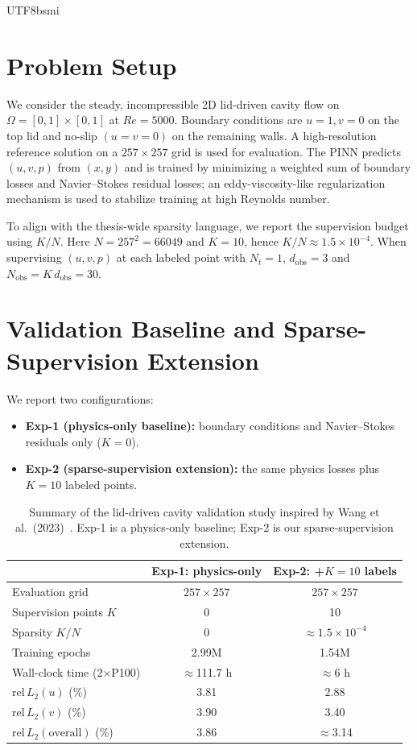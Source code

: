 \documentclass[master]{NTHUthesis}
\begin{document}
\begin{CJK*}{UTF8}{bsmi}
\section{Problem Setup}
We consider the steady, incompressible 2D lid-driven cavity flow on $\Omega=[0,1]\times[0,1]$ at $Re=5000$. Boundary conditions are $u=1, v=0$ on the top lid and no-slip $(u=v=0)$ on the remaining walls. A high-resolution reference solution on a $257\times257$ grid is used for evaluation. The PINN predicts $(u,v,p)$ from $(x,y)$ and is trained by minimizing a weighted sum of boundary losses and Navier--Stokes residual losses; an eddy-viscosity-like regularization mechanism is used to stabilize training at high Reynolds number.

To align with the thesis-wide sparsity language, we report the supervision budget using $K/N$. Here $N=257^2=66049$ and $K=10$, hence $K/N\approx 1.5\times10^{-4}$. When supervising $(u,v,p)$ at each labeled point with $N_t=1$, $d_{\text{obs}}=3$ and $N_{\text{obs}}=K\,d_{\text{obs}}=30$.

\section{Validation Baseline and Sparse-Supervision Extension}
We report two configurations:
\begin{itemize}
    \item \textbf{Exp-1 (physics-only baseline):} boundary conditions and Navier--Stokes residuals only ($K=0$).
    \item \textbf{Exp-2 (sparse-supervision extension):} the same physics losses plus $K=10$ labeled points.
\end{itemize}

\begin{table}[!htbp]
    \centering
    \caption{Summary of the lid-driven cavity validation study inspired by Wang et al.\ (2023)~\cite{wang2023solutionmultiplicityeffectsdata}. Exp-1 is a physics-only baseline; Exp-2 is our sparse-supervision extension.}
    \label{tab:wang2023_repro_summary}
    \footnotesize
    \begin{tabular}{lcc}
        \toprule
        & \textbf{Exp-1: physics-only} & \textbf{Exp-2: +$K{=}10$ labels} \\
        \midrule
        Evaluation grid & $257\times257$ & $257\times257$ \\
        Supervision points $K$ & 0 & 10 \\
        Sparsity $K/N$ & 0 & $\approx 1.5\times10^{-4}$ \\
        Training epochs & 2.99M & 1.54M \\
        Wall-clock time (2$\times$P100) & $\approx$111.7 h & $\approx$6 h \\
        $\mathrm{rel}\,L_2(u)$ (\%) & 3.81 & 2.88 \\
        $\mathrm{rel}\,L_2(v)$ (\%) & 3.90 & 3.40 \\
        $\mathrm{rel}\,L_2(\text{overall})$ (\%) & 3.86 & $\approx$3.14 \\
        \bottomrule
    \end{tabular}
\end{table}
\FloatBarrier


\end{CJK*}
\end{document}
